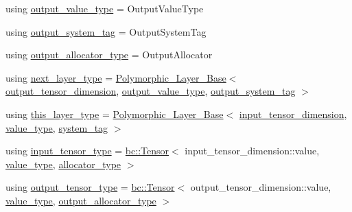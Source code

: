 \begin{DoxyCompactItemize}
\item 
using \hyperlink{structbc_1_1nn_1_1Polymorphic__Layer__Base_a15d1092569f56625cbdf8d7045e66391}{output\+\_\+value\+\_\+type} = Output\+Value\+Type
\item 
using \hyperlink{structbc_1_1nn_1_1Polymorphic__Layer__Base_aeb60d2b5eb18d542fecd5a34fc122bf0}{output\+\_\+system\+\_\+tag} = Output\+System\+Tag
\item 
using \hyperlink{structbc_1_1nn_1_1Polymorphic__Layer__Base_a4bc904c1787b9da18e35d0c6b60ac59f}{output\+\_\+allocator\+\_\+type} = Output\+Allocator
\item 
using \hyperlink{structbc_1_1nn_1_1Polymorphic__Layer__Base_ac7d70db83e8370d2975d05401713f677}{next\+\_\+layer\+\_\+type} = \hyperlink{structbc_1_1nn_1_1Polymorphic__Layer__Base}{Polymorphic\+\_\+\+Layer\+\_\+\+Base}$<$ \hyperlink{structbc_1_1nn_1_1Polymorphic__Layer__Base_a099ec870d177606464f40dfb496d31a2}{output\+\_\+tensor\+\_\+dimension}, \hyperlink{structbc_1_1nn_1_1Polymorphic__Layer__Base_a15d1092569f56625cbdf8d7045e66391}{output\+\_\+value\+\_\+type}, \hyperlink{structbc_1_1nn_1_1Polymorphic__Layer__Base_aeb60d2b5eb18d542fecd5a34fc122bf0}{output\+\_\+system\+\_\+tag} $>$
\item 
using \hyperlink{structbc_1_1nn_1_1Polymorphic__Layer__Base_a6087076d2e0a31e6bbdc2c2039c3ab52}{this\+\_\+layer\+\_\+type} = \hyperlink{structbc_1_1nn_1_1Polymorphic__Layer__Base}{Polymorphic\+\_\+\+Layer\+\_\+\+Base}$<$ \hyperlink{structbc_1_1nn_1_1Polymorphic__Layer__Base_a9cf367e8f043b3bc7ac8ce8f5aeaa832}{input\+\_\+tensor\+\_\+dimension}, \hyperlink{structbc_1_1nn_1_1Polymorphic__Layer__Base_aa7d46845ee0a4544003a6f8fe3b7f52a}{value\+\_\+type}, \hyperlink{structbc_1_1nn_1_1Polymorphic__Layer__Base_a038901ff126b59392a45ffb2d839b3b0}{system\+\_\+tag} $>$
\item 
using \hyperlink{structbc_1_1nn_1_1Polymorphic__Layer__Base_accd9d828714e1abe620fa89aa1556757}{input\+\_\+tensor\+\_\+type} = \hyperlink{namespacebc_a659391e47ab612be3ba6c18cf9c89159}{bc\+::\+Tensor}$<$ input\+\_\+tensor\+\_\+dimension\+::value, \hyperlink{structbc_1_1nn_1_1Polymorphic__Layer__Base_aa7d46845ee0a4544003a6f8fe3b7f52a}{value\+\_\+type}, \hyperlink{structbc_1_1nn_1_1Polymorphic__Layer__Base_a1414f8c37dea6254aebf63e4486ed818}{allocator\+\_\+type} $>$
\item 
using \hyperlink{structbc_1_1nn_1_1Polymorphic__Layer__Base_aaa3bdb6355a104df7c68d46fd4ffa15a}{output\+\_\+tensor\+\_\+type} = \hyperlink{namespacebc_a659391e47ab612be3ba6c18cf9c89159}{bc\+::\+Tensor}$<$ output\+\_\+tensor\+\_\+dimension\+::value, \hyperlink{structbc_1_1nn_1_1Polymorphic__Layer__Base_aa7d46845ee0a4544003a6f8fe3b7f52a}{value\+\_\+type}, \hyperlink{structbc_1_1nn_1_1Polymorphic__Layer__Base_a4bc904c1787b9da18e35d0c6b60ac59f}{output\+\_\+allocator\+\_\+type} $>$

\end{DoxyCompactItemize}
